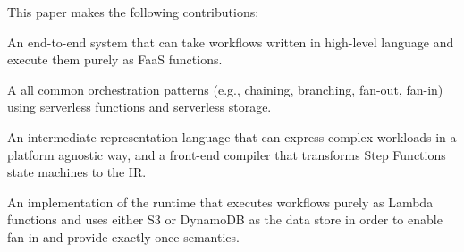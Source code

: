 

This paper makes the following contributions:

\squishlist

  \item An end-to-end system that can take workflows written in high-level
  language and execute them purely as FaaS functions.

  \item A 
   all common
  orchestration patterns (e.g., chaining, branching, fan-out, fan-in) using 
  serverless functions and serverless storage.

  \item An intermediate representation language that can express complex
  workloads in a platform agnostic way, and a front-end
  compiler that transforms Step Functions state machines to the IR.

  \item An implementation of the \name{} runtime that executes workflows purely
  as Lambda functions and uses either S3 or DynamoDB as the data store in order to enable
  fan-in and provide exactly-once semantics. 

\squishend

